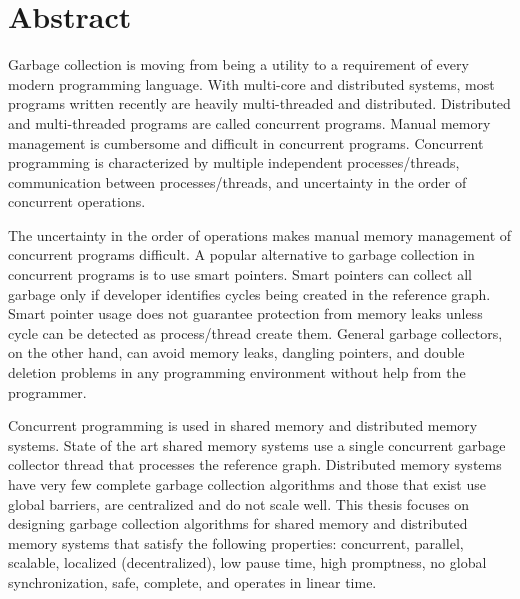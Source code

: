 \chapter*{Abstract}
\label{ch:abstract}

Garbage collection is moving from being a utility to a requirement of every modern programming language. 
With multi-core and distributed systems, most programs written recently are heavily multi-threaded and distributed. Distributed and multi-threaded programs are called concurrent programs. Manual memory management is cumbersome and difficult in concurrent programs.  Concurrent programming is characterized by multiple independent processes/threads, communication between processes/threads, and uncertainty in the order of concurrent operations.

The uncertainty in the order of operations makes manual memory management of concurrent programs difficult. 
A popular alternative to garbage collection in concurrent programs is to use smart pointers.
Smart pointers can collect all garbage only if developer identifies cycles being created in the reference graph. 
Smart pointer usage does not guarantee protection from memory leaks unless cycle can be detected as process/thread create them. General garbage collectors, on the other hand, can avoid memory leaks, dangling pointers, and double deletion problems in any programming environment without help from the programmer.

Concurrent programming is used in shared memory and distributed memory systems. State of the art shared memory systems use a single concurrent garbage collector thread that processes the reference graph. Distributed memory systems have very few complete garbage collection algorithms and those that exist use global barriers, are centralized and do not scale well. This thesis  focuses on designing garbage collection algorithms for shared memory and distributed memory systems that satisfy the following properties: concurrent, parallel, scalable, localized (decentralized), low pause time, high promptness, no global synchronization, safe, complete, and operates in linear time.

